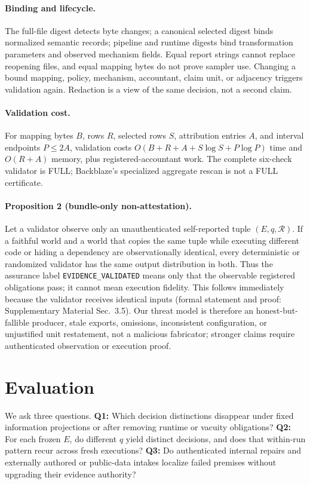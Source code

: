 \documentclass[letterpaper]{article} %
\begin{document}
\paragraph{Binding and lifecycle.}
The full-file digest detects byte changes; a canonical selected digest binds normalized semantic records; pipeline and runtime digests bind transformation parameters and observed mechanism fields. Equal report strings cannot replace reopening files, and equal mapping bytes do not prove sampler use. Changing a bound mapping, policy, mechanism, accountant, claim unit, or adjacency triggers validation again. Redaction is a view of the same decision, not a second claim.

\paragraph{Validation cost.}
For mapping bytes $B$, rows $R$, selected rows $S$, attribution entries $A$, and interval endpoints $P\leq2A$, validation costs $O(B+R+A+S\log S+P\log P)$ time and $O(R+A)$ memory, plus registered-accountant work. The complete six-check validator is FULL; Backblaze's specialized aggregate rescan is not a FULL certificate.

\paragraph{Proposition 2 (bundle-only non-attestation).}
Let a validator observe only an unauthenticated self-reported tuple $(E,q,\mathcal R)$. If a faithful world and a world that copies the same tuple while executing different code or hiding a dependency are observationally identical, every deterministic or randomized validator has the same output distribution in both. Thus the assurance label \texttt{EVIDENCE\_VALIDATED} means only that the observable registered obligations pass; it cannot mean execution fidelity. This follows immediately because the validator receives identical inputs (formal statement and proof: Supplementary Material Sec.~3.5). Our threat model is therefore an honest-but-fallible producer, stale exports, omissions, inconsistent configuration, or unjustified unit restatement, not a malicious fabricator; stronger claims require authenticated observation or execution proof.

\section{Evaluation}

We ask three questions. \textbf{Q1:} Which decision distinctions disappear under fixed information projections or after removing runtime or vacuity obligations? \textbf{Q2:} For each frozen $E$, do different $q$ yield distinct decisions, and does that within-run pattern recur across fresh executions? \textbf{Q3:} Do authenticated internal repairs and externally authored or public-data intakes localize failed premises without upgrading their evidence authority?
\end{document}
